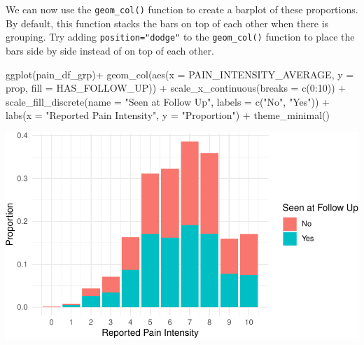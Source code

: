 \documentclass[
  letterpaper,
]{latex/krantz}
\makeatletter
\newenvironment{Shaded}{\begin{snugshade}}{\end{snugshade}}
\newcommand{\AttributeTok}[1]{\textcolor[rgb]{0.40,0.45,0.13}{#1}}
\newcommand{\DecValTok}[1]{\textcolor[rgb]{0.68,0.00,0.00}{#1}}
\newcommand{\FunctionTok}[1]{\textcolor[rgb]{0.28,0.35,0.67}{#1}}
\newcommand{\NormalTok}[1]{\textcolor[rgb]{0.00,0.23,0.31}{#1}}
\newcommand{\SpecialCharTok}[1]{\textcolor[rgb]{0.37,0.37,0.37}{#1}}
\newcommand{\StringTok}[1]{\textcolor[rgb]{0.13,0.47,0.30}{#1}}
\newenvironment{kframe}{%
\medskip{}
\setlength{\fboxsep}{.8em}
 \def\at@end@of@kframe{}%
 \ifinner\ifhmode%
  \def\at@end@of@kframe{\end{minipage}}%
  \begin{minipage}{\columnwidth}%
 \fi\fi%
 \def\FrameCommand##1{\hskip\@totalleftmargin \hskip-\fboxsep
 \colorbox{shadecolor}{##1}\hskip-\fboxsep
     \hskip-\linewidth \hskip-\@totalleftmargin \hskip\columnwidth}%
 \MakeFramed {\advance\hsize-\width
   \@totalleftmargin\z@ \linewidth\hsize
   \@setminipage}}%
 {\par\unskip\endMakeFramed%
 \at@end@of@kframe}
\renewenvironment{Shaded}{\begin{kframe}}{\end{kframe}}
\makeatother
\begin{document}
We can now use the
\texttt{geom\_col()}
function to create a barplot of these proportions. By default, this
function stacks the bars on top of each other when there is grouping.
Try adding \texttt{position="dodge"} to the \texttt{geom\_col()}
function to place the bars side by side instead of on top of each other.

\begin{Shaded}
\begin{Highlighting}[]
\FunctionTok{ggplot}\NormalTok{(pain\_df\_grp)}\SpecialCharTok{+}
  \FunctionTok{geom\_col}\NormalTok{(}\FunctionTok{aes}\NormalTok{(}\AttributeTok{x =}\NormalTok{ PAIN\_INTENSITY\_AVERAGE, }\AttributeTok{y =}\NormalTok{ prop, }
               \AttributeTok{fill =}\NormalTok{ HAS\_FOLLOW\_UP)) }\SpecialCharTok{+}
  \FunctionTok{scale\_x\_continuous}\NormalTok{(}\AttributeTok{breaks =} \FunctionTok{c}\NormalTok{(}\DecValTok{0}\SpecialCharTok{:}\DecValTok{10}\NormalTok{)) }\SpecialCharTok{+} 
  \FunctionTok{scale\_fill\_discrete}\NormalTok{(}\AttributeTok{name =} \StringTok{"Seen at Follow Up"}\NormalTok{, }
                      \AttributeTok{labels =} \FunctionTok{c}\NormalTok{(}\StringTok{"No"}\NormalTok{, }\StringTok{"Yes"}\NormalTok{)) }\SpecialCharTok{+}
  \FunctionTok{labs}\NormalTok{(}\AttributeTok{x =} \StringTok{"Reported Pain Intensity"}\NormalTok{, }\AttributeTok{y =} \StringTok{"Proportion"}\NormalTok{) }\SpecialCharTok{+}
  \FunctionTok{theme\_minimal}\NormalTok{()}
\end{Highlighting}
\end{Shaded}

\begin{center}
\includegraphics[width=1\textwidth,height=\textheight]{book/visualization_ggplot_files/figure-pdf/unnamed-chunk-18-1.pdf}
\end{center}
\end{document}
